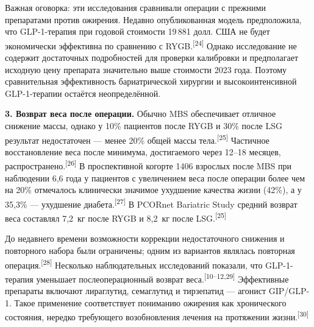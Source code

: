 \documentclass[11pt,a4paper]{article}
\newcommand{\src}[1]{\textsuperscript{[#1]}}
\begin{document}
Важная оговорка: эти исследования сравнивали операции с прежними препаратами против ожирения. Недавно опубликованная модель предположила, что GLP-1-терапия при годовой стоимости 19\,881 долл. США не будет экономически эффективна по сравнению с RYGB.\src{24} Однако исследование не содержит достаточных подробностей для проверки калибровки и предполагает исходную цену препарата значительно выше стоимости 2023 года. Поэтому сравнительная эффективность бариатрической хирургии и высокоинтенсивной GLP-1-терапии остаётся неопределённой.

\textbf{3. Возврат веса после операции.} Обычно MBS обеспечивает отличное снижение массы, однако у 10\% пациентов после RYGB и 30\% после LSG результат недостаточен --- менее 20\% общей массы тела.\src{25} Частичное восстановление веса после минимума, достигаемого через 12--18 месяцев, распространено.\src{26} В проспективной когорте 1406 взрослых после MBS при наблюдении 6,6 года у пациентов с увеличением веса после операции более чем на 20\% отмечалось клинически значимое ухудшение качества жизни (42\%), а у 35,3\% --- ухудшение диабета.\src{27} В PCORnet Bariatric Study средний возврат веса составлял 7,2~кг после RYGB и 8,2~кг после LSG.\src{25}

До недавнего времени возможности коррекции недостаточного снижения и повторного набора были ограничены; одним из вариантов являлась повторная операция.\src{28} Несколько наблюдательных исследований показали, что GLP-1-терапия уменьшает послеоперационный возврат веса.\src{10--12,29} Эффективные препараты включают лираглутид, семаглутид и тирзепатид --- агонист GIP/GLP-1. Такое применение соответствует пониманию ожирения как хронического состояния, нередко требующего возобновления лечения на протяжении жизни.\src{30}
\end{document}
